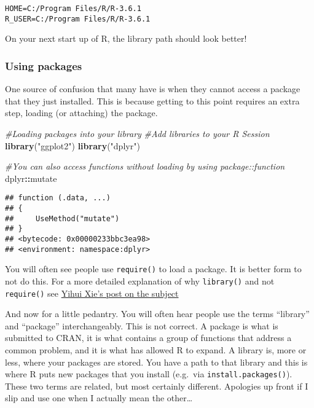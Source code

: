 \documentclass[]{article}
\newenvironment{Shaded}{\begin{snugshade}}{\end{snugshade}}
\newcommand{\CommentTok}[1]{\textcolor[rgb]{0.56,0.35,0.01}{\textit{#1}}}
\newcommand{\KeywordTok}[1]{\textcolor[rgb]{0.13,0.29,0.53}{\textbf{#1}}}
\newcommand{\NormalTok}[1]{#1}
\newcommand{\OperatorTok}[1]{\textcolor[rgb]{0.81,0.36,0.00}{\textbf{#1}}}
\newcommand{\StringTok}[1]{\textcolor[rgb]{0.31,0.60,0.02}{#1}}
\begin{document}
\begin{verbatim}
HOME=C:/Program Files/R/R-3.6.1
R_USER=C:/Program Files/R/R-3.6.1
\end{verbatim}

On your next start up of R, the library path should look better!

\hypertarget{using-packages}{%
\subsubsection{Using packages}\label{using-packages}}

One source of confusion that many have is when they cannot access a
package that they just installed. This is because getting to this point
requires an extra step, loading (or attaching) the package.

\begin{Shaded}
\begin{Highlighting}[]
\CommentTok{#Loading packages into your library}
\CommentTok{#Add libraries to your R Session}
\KeywordTok{library}\NormalTok{(}\StringTok{"ggplot2"}\NormalTok{)}
\KeywordTok{library}\NormalTok{(}\StringTok{"dplyr"}\NormalTok{)}

\CommentTok{#You can also access functions without loading by using package::function}
\NormalTok{dplyr}\OperatorTok{::}\NormalTok{mutate}
\end{Highlighting}
\end{Shaded}

\begin{verbatim}
## function (.data, ...) 
## {
##     UseMethod("mutate")
## }
## <bytecode: 0x00000233bbc3ea98>
## <environment: namespace:dplyr>
\end{verbatim}

You will often see people use \texttt{require()} to load a package. It
is better form to not do this. For a more detailed explanation of why
\texttt{library()} and not \texttt{require()} see
\href{http://yihui.name/en/2014/07/library-vs-require/.}{Yihui Xie's
post on the subject}

And now for a little pedantry. You will often hear people use the terms
``library'' and ``package'' interchangeably. This is not correct. A
package is what is submitted to CRAN, it is what contains a group of
functions that address a common problem, and it is what has allowed R to
expand. A library is, more or less, where your packages are stored. You
have a path to that library and this is where R puts new packages that
you install (e.g.~via \texttt{install.packages()}). These two terms are
related, but most certainly different. Apologies up front if I slip and
use one when I actually mean the other\ldots{}
\end{document}
